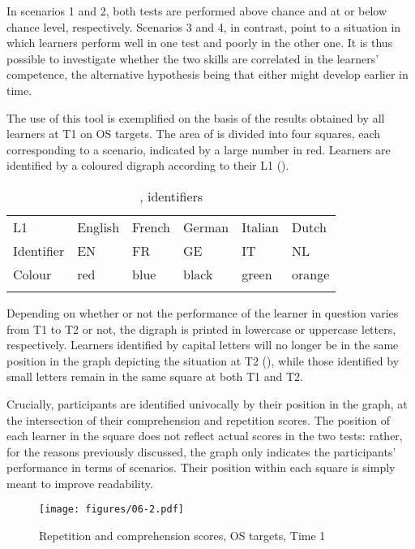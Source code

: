 In scenarios 1 and 2, both tests are performed above chance and at or below chance level, respectively. Scenarios 3 and 4, in contrast, point to a situation in which learners perform well in one test and poorly in the other one. It is thus possible to investigate whether the two skills are correlated in the learners' competence, the alternative hypothesis being that either might develop earlier in time.

The use of this tool is exemplified on the basis of the results obtained by all learners at T1 on OS targets. The area of  is divided into four squares, each corresponding to a scenario, indicated by a large number in red. Learners are identified by a coloured digraph according to their L1 ().

\begin{table}
    \begin{tabularx}{\textwidth}{XXXXXX}
    \lsptoprule
    L1 & English & French & German & Italian & Dutch\\
    Identifier & EN & FR & GE & IT & NL\\
    Colour & red & blue & black & green & orange\\
    \lspbottomrule
    \end{tabularx}
    \caption{, identifiers}
    \label{tab:06:3}
\end{table}

Depending on whether or not the performance of the learner in question varies from T1 to T2 or not, the digraph is printed in lowercase or uppercase letters, respectively. Learners identified by capital letters will no longer be in the same position in the graph depicting the situation at T2 (), while those identified by small letters remain in the same square at both T1 and T2. 

Crucially, participants are identified univocally by their position in the graph, at the intersection of their comprehension and repetition scores. The position of each learner in the square does not reflect actual scores in the two tests: rather, for the reasons previously discussed, the graph only indicates the participants’ performance in terms of scenarios. Their position within each square is simply meant to improve readability. 

\begin{figure}
    \texttt{[image: figures/06-2.pdf]}
    \caption{Repetition and comprehension scores, OS targets, Time 1}
    \label{fig:06:2}
\end{figure}

